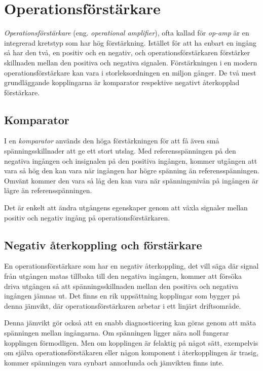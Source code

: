 \section{Operationsförstärkare}
\label{op-amp}

\emph{Operationsförstärkare} (eng. \emph{operational amplifier}), ofta kallad
för \emph{op-amp} är en integrerad kretstyp som har hög förstärkning.
Istället för att ha enbart en ingång så har den två, en positiv
och en negativ, och operationsförstärkaren förstärker skillnaden mellan den
positiva och negativa signalen. Förstärkningen i en modern
operationsförstärkare kan vara i storleksordningen en miljon gånger.
De två mest grundläggande kopplingarna är komparator respektive negativt
återkopplad förstärkare.

\subsection{Komparator}

I en \emph{komparator} används den höga förstärkningen för att få även små
spänningsskillnader att ge ett stort utslag.
Med referensspänningen på den negativa ingången och insignalen på den positiva
ingången, kommer utgången att vara så hög den kan vara när ingången har högre
spänning än referensspänningen.
Omvänt kommer den vara så låg den kan vara när spänningsnivån på ingången är
lägre än referensspänningen.

Det är enkelt att ändra utgångens egenskaper genom att växla signaler mellan
positiv och negativ ingång på operationsförstärkaren.

\subsection{Negativ återkoppling och förstärkare}

En operationsförstärkare som har en negativ återkoppling, det vill säga där
signal från utgången matas tillbaka till den negativa ingången, kommer att
försöka driva utgången så att spänningsskillnaden mellan den positiva och
negativa ingången jämnas ut.
Det finns en rik uppsättning kopplingar som bygger på denna jämvikt, där
operationsförstärkaren arbetar i ett linjärt driftsområde.

Denna jämvikt gör också att en snabb diagnosticering kan göras genom att mäta
spänningen mellan ingångarna.
Om spänningen ligger nära noll fungerar kopplingen förmodligen.
Men om kopplingen är felaktig på något sätt, exempelvis om själva
operationsförstäkaren eller någon komponent i återkopplingen är trasig, kommer
spänningen vara synbart annorlunda och jämvikten finns inte.


